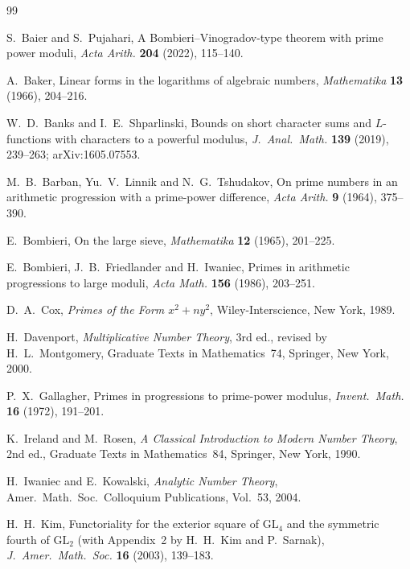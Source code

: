 \documentclass[12pt]{amsart}
\theoremstyle{plain}
\theoremstyle{definition}
\begin{document}
\begin{thebibliography}{99}


S.~Baier and S.~Pujahari,
A Bombieri--Vinogradov-type theorem with prime power moduli,
\emph{Acta Arith.} \textbf{204} (2022), 115--140.

A.~Baker,
Linear forms in the logarithms of algebraic numbers,
\emph{Mathematika} \textbf{13} (1966), 204--216.

W.~D.~Banks and I.~E.~Shparlinski,
Bounds on short character sums and $L$-functions with characters to a
powerful modulus,
\emph{J.\ Anal.\ Math.} \textbf{139} (2019), 239--263; arXiv:1605.07553.

M.~B.~Barban, Yu.~V.~Linnik and N.~G.~Tshudakov,
On prime numbers in an arithmetic progression with a prime-power difference,
\emph{Acta Arith.} \textbf{9} (1964), 375--390.

E.~Bombieri,
On the large sieve,
\emph{Mathematika} \textbf{12} (1965), 201--225.

E.~Bombieri, J.~B.~Friedlander and H.~Iwaniec,
Primes in arithmetic progressions to large moduli,
\emph{Acta Math.} \textbf{156} (1986), 203--251.

D.~A.~Cox,
\emph{Primes of the Form $x^2 + ny^2$},
Wiley-Interscience, New York, 1989.

H.~Davenport,
\emph{Multiplicative Number Theory}, 3rd ed., revised by H.~L.~Montgomery,
Graduate Texts in Mathematics~74, Springer, New York, 2000.

P.~X.~Gallagher,
Primes in progressions to prime-power modulus,
\emph{Invent.\ Math.} \textbf{16} (1972), 191--201.

K.~Ireland and M.~Rosen,
\emph{A Classical Introduction to Modern Number Theory}, 2nd ed.,
Graduate Texts in Mathematics~84, Springer, New York, 1990.

H.~Iwaniec and E.~Kowalski,
\emph{Analytic Number Theory},
Amer.\ Math.\ Soc.\ Colloquium Publications, Vol.~53, 2004.

H.~H.~Kim,
Functoriality for the exterior square of $\mathrm{GL}_4$ and the symmetric
fourth of $\mathrm{GL}_2$ (with Appendix~2 by H.~H.~Kim and P.~Sarnak),
\emph{J.\ Amer.\ Math.\ Soc.} \textbf{16} (2003), 139--183.


\end{thebibliography}
\end{document}
